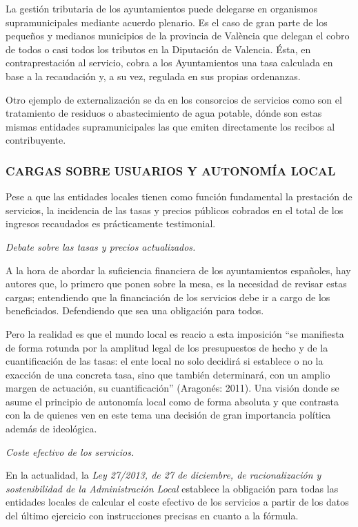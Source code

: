 \documentclass[
]{article}
\begin{document}
La gestión tributaria de los ayuntamientos puede delegarse en organismos
supramunicipales mediante acuerdo plenario. Es el caso de gran parte de
los pequeños y medianos municipios de la provincia de València que
delegan el cobro de todos o casi todos los tributos en la Diputación de
Valencia. Ésta, en contraprestación al servicio, cobra a los
Ayuntamientos una tasa calculada en base a la recaudación y, a su vez,
regulada en sus propias ordenanzas.

Otro ejemplo de externalización se da en los consorcios de servicios
como son el tratamiento de residuos o abastecimiento de agua potable,
dónde son estas mismas entidades supramunicipales las que emiten
directamente los recibos al contribuyente.

\hypertarget{cargas-sobre-usuarios-y-autonomuxeda-local}{%
\subsubsection{CARGAS SOBRE USUARIOS Y AUTONOMÍA
LOCAL}\label{cargas-sobre-usuarios-y-autonomuxeda-local}}

Pese a que las entidades locales tienen como función fundamental la
prestación de servicios, la incidencia de las tasas y precios públicos
cobrados en el total de los ingresos recaudados es prácticamente
testimonial.

\emph{Debate sobre las tasas y precios actualizados.}

A la hora de abordar la suficiencia financiera de los ayuntamientos
españoles, hay autores que, lo primero que ponen sobre la mesa, es la
necesidad de revisar estas cargas; entendiendo que la financiación de
los servicios debe ir a cargo de los beneficiados. Defendiendo que sea
una obligación para todos.

Pero la realidad es que el mundo local es reacio a esta imposición ``se
manifiesta de forma rotunda por la amplitud legal de los presupuestos de
hecho y de la cuantificación de las tasas: el ente local no solo
decidirá si establece o no la exacción de una concreta tasa, sino que
también determinará, con un amplio margen de actuación, su
cuantificación'' (Aragonés: 2011). Una visión donde se asume el
principio de autonomía local como de forma absoluta y que contrasta con
la de quienes ven en este tema una decisión de gran importancia política
además de ideológica.

\emph{Coste efectivo de los servicios.}

En la actualidad, la \emph{Ley 27/2013, de 27 de diciembre, de
racionalización y sostenibilidad de la Administración Local} establece
la obligación para todas las entidades locales de calcular el coste
efectivo de los servicios a partir de los datos del último ejercicio con
instrucciones precisas en cuanto a la fórmula.
\end{document}
